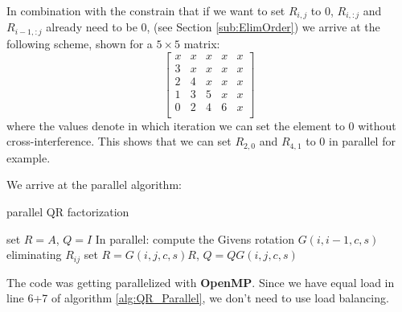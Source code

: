 \documentclass[a4paper]{scrartcl}
\begin{document}
                
                In combination with the constrain that if we want to set
                $R_{i,j}$ to 0, $R_{i, :j}$ and $R_{i-1, :j}$ already need to be
                0, (see Section \ref{sub:ElimOrder}) we arrive at the following
                scheme, shown for a $5\times 5$ matrix:
                \begin{equation}\label{eq:It_Scheme}
                    \begin{bmatrix}
                        x & x & x & x & x \\
                        3 & x & x & x & x \\
                        2 & 4 & x & x & x \\
                        1 & 3 & 5 & x & x \\
                        0 & 2 & 4 & 6 & x \\
                    \end{bmatrix}
                \end{equation}
                where the values denote in which iteration we can set the
                element to 0 without cross-interference. This shows that we can
                set $R_{2,0}$ and $R_{4,1}$ to 0 in parallel for example.

                We arrive at the parallel algorithm:
                \begin{algorithm}[H]
                    \caption{parallel QR factorization }\label{alg:QR_Parallel}
                    \begin{algorithmic}[1]
                            \State set $R=A$, $Q=I$
                                \State In parallel:
                                    \State compute the Givens rotation $G(i,i-1,c,s)$ eliminating $R_{ij}$ 
                                    \State set $R=G(i,j,c,s) R$, $Q = Q G(i,j,c,s)$
                                \EndFor
                            \EndFor
                        \EndProcedure
                    \end{algorithmic}
                \end{algorithm}

                The code was getting parallelized with \textbf{OpenMP}. Since we
                have equal load in line 6+7 of algorithm \ref{alg:QR_Parallel},
                we don't need to use load balancing.
\end{document}
